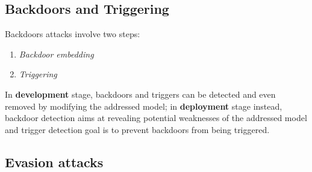 \subsection{Backdoors and Triggering}
Backdoors attacks involve two steps:
\begin{enumerate}
   \item \textit{Backdoor embedding}
   \item \textit{Triggering}
\end{enumerate}

In \textbf{development} stage, backdoors and triggers can be detected and
even removed by modifying the addressed model;
in \textbf{deployment} stage instead, backdoor detection aims at revealing potential
weaknesses of the addressed model and trigger detection goal is to
prevent backdoors from being triggered.

\subsection{Evasion attacks}